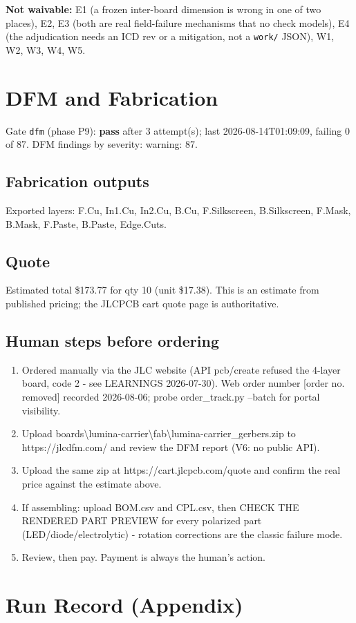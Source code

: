 \documentclass[11pt,a4paper]{article}
\begin{document}
\textbf{Not waivable:} E1 (a frozen inter-board dimension is wrong in one of two places), E2, E3 (both are real field-failure mechanisms that no check models), E4 (the adjudication needs an ICD rev or a mitigation, not a \texttt{work/} JSON), W1, W2, W3, W4, W5.

\section{DFM and Fabrication}
Gate \texttt{dfm} (phase P9): \textbf{pass} after 3 attempt(s); last 2026-08-14T01:09:09, failing 0 of 87.
DFM findings by severity: warning: 87.
\subsection*{Fabrication outputs}
Exported layers: F.Cu, In1.Cu, In2.Cu, B.Cu, F.Silkscreen, B.Silkscreen, F.Mask, B.Mask, F.Paste, B.Paste, Edge.Cuts.
\subsection*{Quote}
Estimated total \$173.77 for qty 10 (unit \$17.38). This is an estimate from published pricing; the JLCPCB cart quote page is authoritative.
\subsection*{Human steps before ordering}
\begin{enumerate}
\item Ordered manually via the JLC website (API pcb/create refused the 4-layer board, code 2 - see LEARNINGS 2026-07-30). Web order number [order no. removed] recorded 2026-08-06; probe order\_track.py --batch for portal visibility.
\item Upload boards\textbackslash{}lumina-carrier\textbackslash{}fab\textbackslash{}lumina-carrier\_gerbers.zip to https://jlcdfm.com/ and review the DFM report (V6: no public API).
\item Upload the same zip at https://cart.jlcpcb.com/quote and confirm the real price against the estimate above.
\item If assembling: upload BOM.csv and CPL.csv, then CHECK THE RENDERED PART PREVIEW for every polarized part (LED/diode/electrolytic) - rotation corrections are the classic failure mode.
\item Review, then pay. Payment is always the human's action.
\end{enumerate}
\section{Run Record (Appendix)}
\end{document}
